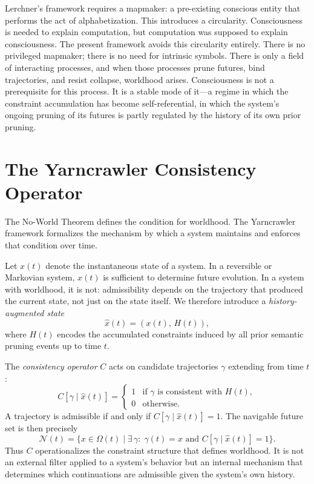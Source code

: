 \documentclass[11pt]{article}
\theoremstyle{definition}
\theoremstyle{remark}
\begin{document}
Lerchner's framework requires a mapmaker: a pre-existing conscious entity that performs
the act of alphabetization. This introduces a circularity. Consciousness is needed to
explain computation, but computation was supposed to explain consciousness. The present
framework avoids this circularity entirely. There is no privileged mapmaker; there is no
need for intrinsic symbols. There is only a field of interacting processes, and when those
processes prune futures, bind trajectories, and resist collapse, worldhood arises. Consciousness
is not a prerequisite for this process. It is a stable mode of it---a regime in which the
constraint accumulation has become self-referential, in which the system's ongoing pruning
of its futures is partly regulated by the history of its own prior pruning.

\section{The Yarncrawler Consistency Operator}

The No-World Theorem defines the condition for worldhood. The Yarncrawler framework
formalizes the mechanism by which a system maintains and enforces that condition over time.

Let $x(t)$ denote the instantaneous state of a system. In a reversible or Markovian system,
$x(t)$ is sufficient to determine future evolution. In a system with worldhood, it is not:
admissibility depends on the trajectory that produced the current state, not just on the
state itself. We therefore introduce a \emph{history-augmented state}
\[
\hat{x}(t) = (x(t),\, H(t)),
\]
where $H(t)$ encodes the accumulated constraints induced by all prior semantic pruning
events up to time $t$.

The \emph{consistency operator} $C$ acts on candidate trajectories $\gamma$ extending from
time $t$:
\[
C[\gamma \mid \hat{x}(t)] =
\begin{cases}
1 & \text{if } \gamma \text{ is consistent with } H(t), \\
0 & \text{otherwise.}
\end{cases}
\]
A trajectory is admissible if and only if $C[\gamma \mid \hat{x}(t)] = 1$. The navigable
future set is then precisely
\[
\mathcal{N}(t) = \bigl\{ x \in \Omega(t) \;\big|\; \exists\, \gamma:\; \gamma(t) = x
\text{ and } C[\gamma \mid \hat{x}(t)] = 1 \bigr\}.
\]
Thus $C$ operationalizes the constraint structure that defines worldhood. It is not an
external filter applied to a system's behavior but an internal mechanism that determines
which continuations are admissible given the system's own history.
\end{document}
